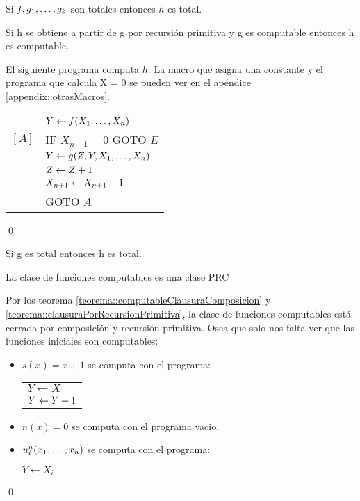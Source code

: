 \begin{proposicion}
	Si $f,g_1,\dots, g_{k}$ son totales entonces $h$ es total.
\end{proposicion}

\begin{teorema}\label{teorema::clausuraPorRecursionPrimitiva}
	Si h se obtiene a partir de g por recursión primitiva y g es computable entonces h es computable.
\end{teorema}

\begin{demo}
	El siguiente programa computa $h$. La macro que asigna una constante y el programa que calcula X = 0 se pueden ver en el apéndice \ref{appendix::otrasMacros}. 
	
	\begin{center}
		\begin{tabular}{ll}
			& $Y \leftarrow f(X_1,\dots, X_{n})$ \\
			$[A]$ & IF $X_{n+1} = 0$ GOTO $E$ \\
			& $Y \leftarrow g(Z,Y,X_1,\dots, X_{n})$ \\
			& $Z \leftarrow Z + 1$ \\
			& $X_{n+1} \leftarrow X_{n+1} - 1$ \\
			& GOTO $A$
		\end{tabular}
	\end{center}\qed
\end{demo}

\begin{proposicion}
	Si g es total entonces h es total.
\end{proposicion}

\begin{teorema}\label{teorema::computablesEsPRC}
	La clase de funciones computables es una clase PRC
\end{teorema}

\begin{demo}[computablesEsPRC]
	Por los teorema \ref{teorema::computableClausuraComposicion} y \ref{teorema::clausuraPorRecursionPrimitiva}, la clase de funciones computables está cerrada por composición y recursión primitiva. Osea que solo nos falta ver que las funciones iniciales son computables:
	\begin{itemize}
		\item $s(x) = x + 1$ se computa con el programa:
		\begin{center}
			\begin{tabular}{l}
			$Y \leftarrow X$\\
			$Y \leftarrow Y + 1$
			\end{tabular}
		\end{center} 
		\item $n(x) = 0$ se computa con el programa vacio.
		\item $u_i^n(x_1,\dots, x_{n})$ se computa con el programa:
		\begin{center}
			$Y \leftarrow X_i$
		\end{center}		
	\end{itemize}\qed
\end{demo}

